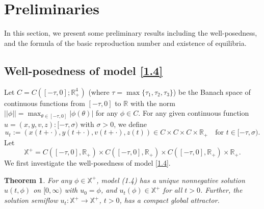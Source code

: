 \documentclass[10pt,a4paper]{amsart}
\numberwithin{equation}{section}
\newtheorem{theorem}{Theorem}[section]
\begin{document}
\section{Preliminaries}

In this section, we present some preliminary results including 
the well-posedness,  and the formula of
the basic reproduction number and existence of equilibria.


\subsection{Well-posedness of model \eqref{1.4}}

Let $C =C([-\tau,0];\mathbb{R}_{+}^{4})$ (where $\tau=\max \{\tau_1,\tau_2,\tau_3\}$) 
be the Banach space of continuous functions from $[-\tau, 0]$
to $\mathbb{R}$ with the norm $||\phi||=\max_{\theta\in [-\tau,0]}|\phi(\theta)|$ for 
any $\phi\in C$.
 For any given continuous function $u = (x, y, v, z): [-\tau,\sigma)$ with $\sigma>0$, 
we define
$$
u_t :=(x(t + \cdot), y(t + \cdot), v(t + \cdot), z(t))
\in C\times C\times C\times \mathbb{R}_+\quad \text{for  } t\in  [-\tau,\sigma).
$$
Let
$$
\mathbb{X}^+=C([-\tau,0], \mathbb{R}_+)\times C([-\tau,0], 
\mathbb{R}_+)\times C([-\tau,0], \mathbb{R}_+)\times \mathbb{R}_+.
$$
We first investigate the well-posedness of model \eqref{1.4}.

\begin{theorem}\label{T2.1}
For any $\phi \in \mathbb{X}^+ $, model (1.4) has a unique nonnegative solution 
$u(t,\phi)$  on $[0,\infty)$ with $u_0=\phi$, and $u_t(\phi)\in \mathbb{X}^+ $ for all
$t>0$.  Further, the solution semiflow $u_t: \mathbb{X}^+ \to \mathbb{X}^+$, $t>0$, 
has a compact global attractor.
\end{theorem}
\end{document}
